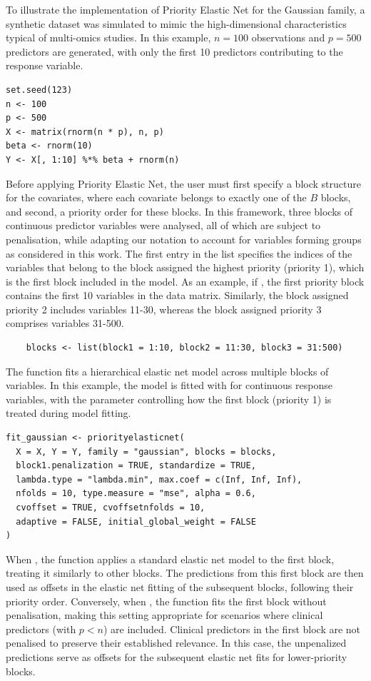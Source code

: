 To illustrate the implementation of Priority Elastic Net for the Gaussian family, a synthetic dataset was simulated to mimic the high-dimensional characteristics typical of multi-omics studies. In this example, \(n=100\) observations and \(p=500\) predictors are generated, with only the first 10 predictors contributing to the response variable.
{\small
\begin{verbatim}
set.seed(123)
n <- 100  
p <- 500  
X <- matrix(rnorm(n * p), n, p)
beta <- rnorm(10) 
Y <- X[, 1:10] %*% beta + rnorm(n)
\end{verbatim}
}
Before applying Priority Elastic Net, the user must first specify a block structure for the covariates, where each covariate belongs to exactly one of the \( B \) blocks, and second, a priority order for these blocks. In this framework, three blocks of continuous predictor variables were analysed, all of which are subject to penalisation, while adapting our notation to account for variables forming groups as considered in this work. The first entry in the  list specifies the indices of the variables that belong to the block assigned the highest priority (priority 1), which is the first block included in the model. As an example, if , the first priority block contains the first 10 variables in the data matrix. Similarly, the block assigned priority 2 includes variables 11-30, whereas the block assigned priority 3 comprises variables 31-500.
{\small
\begin{verbatim}
    blocks <- list(block1 = 1:10, block2 = 11:30, block3 = 31:500)
\end{verbatim}
}
The  function fits a hierarchical elastic net model across multiple blocks of variables. In this example, the model is fitted with  for continuous response variables, with the  parameter controlling how the first block (priority 1) is treated during model fitting.
{\small
\begin{lstlisting}
fit_gaussian <- priorityelasticnet(
  X = X, Y = Y, family = "gaussian", blocks = blocks,
  block1.penalization = TRUE, standardize = TRUE,
  lambda.type = "lambda.min", max.coef = c(Inf, Inf, Inf),
  nfolds = 10, type.measure = "mse", alpha = 0.6,
  cvoffset = TRUE, cvoffsetnfolds = 10,
  adaptive = FALSE, initial_global_weight = FALSE
)
\end{lstlisting}
}
When , the function applies a standard elastic net model to the first block, treating it similarly to other blocks. The predictions from this first block are then used as offsets in the elastic net fitting of the subsequent blocks, following their priority order. Conversely, when , the function fits the first block without penalisation, making this setting appropriate for scenarios where clinical predictors (with $p<n$) are included. Clinical predictors in the first block are not penalised to preserve their established relevance. In this case, the unpenalized predictions serve as offsets for the subsequent elastic net fits for lower-priority blocks.

